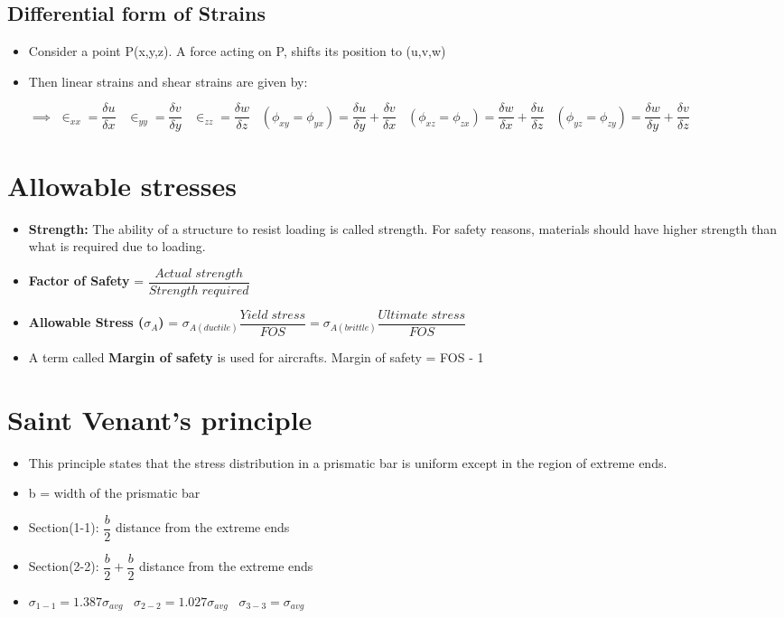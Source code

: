 \documentclass[8pt]{report}
\begin{document}
		\subsection{Differential form of Strains}
			\begin{itemize}
				\item Consider a point P(x,y,z). A force acting on P, shifts its position to (u,v,w)
				\item Then linear strains and shear strains are given by:
				\item[$\implies$] $\boxed{\in_{xx} = \dfrac{\delta u}{\delta x}}\;\;\; \boxed{\in_{yy} = \dfrac{\delta v}{\delta y}}\;\;\; \boxed{\in_{zz} = \dfrac{\delta w}{\delta z}}\;\;\; \boxed{(\phi_{xy}=\phi_{yx})=\dfrac{\delta u}{\delta y} + \dfrac{\delta v}{\delta x}}\;\;\; \boxed{(\phi_{xz}=\phi_{zx})=\dfrac{\delta w}{\delta x} + \dfrac{\delta u}{\delta z}}\;\;\; \boxed{(\phi_{yz}=\phi_{zy})=\dfrac{\delta w}{\delta y} + \dfrac{\delta v}{\delta z}}\;\;\;$
			\end{itemize}\hrulefill
	\section{Allowable stresses}
		\begin{itemize}
			\item \textbf{Strength: }The ability of a structure to resist loading is called strength. For safety reasons, materials should have higher strength than what is required due to loading. 
			\item \textbf{Factor of Safety} = $\dfrac{Actual\;strength}{Strength\;required}$
			\item \textbf{Allowable Stress ($\sigma_{A}$)} = $\boxed{\sigma_{A(ductile)}\dfrac{Yield\;stress}{FOS}} = \boxed{\sigma_{A(brittle)}\dfrac{Ultimate\;stress}{FOS}}$
			\item A term called \textbf{Margin of safety} is used for aircrafts. Margin of safety = FOS - 1
		\end{itemize}\hrulefill
	\section{Saint Venant's principle}
		\begin{itemize}
			\item This principle states that the stress distribution in a prismatic bar is uniform except in the region of extreme ends.
			\item b = width of the prismatic bar
			\item Section(1-1): $\dfrac{b}{2}$ distance from the extreme ends
			\item Section(2-2): $\dfrac{b}{2} + \dfrac{b}{2}$ distance from the extreme ends
			\item $\boxed{\sigma_{1-1}=1.387\sigma_{avg}}\;\;\;\boxed{\sigma_{2-2}=1.027\sigma_{avg}}\;\;\;\boxed{\sigma_{3-3}=\sigma_{avg}}$
		\end{itemize}\hrulefill
\end{document}
